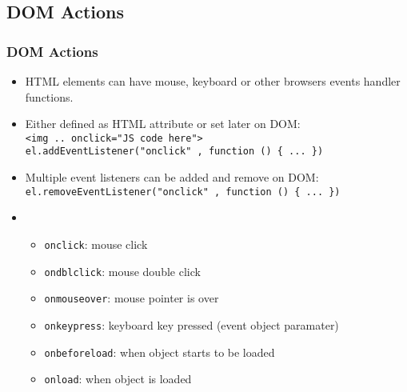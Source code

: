 \documentclass[trans,compress,xcolor=table]{beamer}
\begin{document}
\subsection*{DOM Actions}
\begin{frame}[fragile]
\frametitle{DOM Actions}
\begin{itemize}
\item HTML elements can have mouse, keyboard or other
browsers events handler functions.
\item Either defined as HTML attribute or set later on DOM:\\
	\lstinline!<img .. onclick="JS code here">!\\
	\lstinline!el.addEventListener("onclick" , function () { ... })!
\item Multiple event listeners can be added and remove on DOM:\\
	\lstinline!el.removeEventListener("onclick" , function () { ... })!
\item
\begin{itemize}
\item \lstinline!onclick!: mouse click
\item \lstinline!ondblclick!: mouse double click
\item \lstinline!onmouseover!: mouse pointer is over
\item \lstinline!onkeypress!: keyboard key pressed (event object paramater)
\item \lstinline!onbeforeload!: when object starts to be loaded
\item \lstinline!onload!: when object is loaded
\end{itemize}
\end{itemize}
\end{frame}
\end{document}
